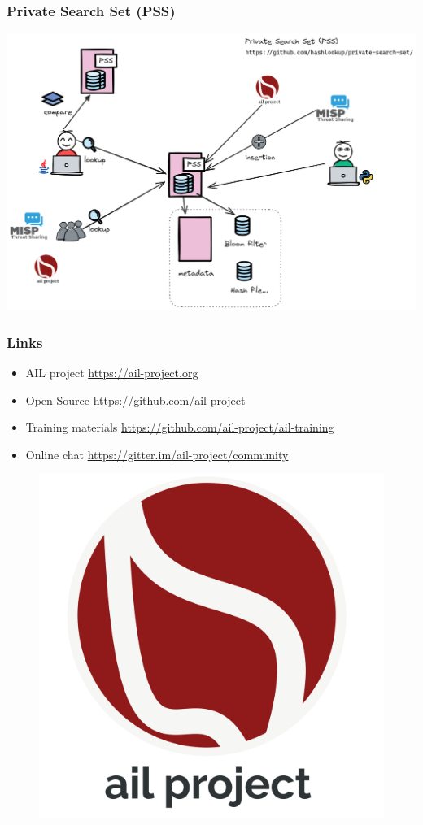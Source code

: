 \documentclass{beamer}
\begin{document}
\begin{frame}
    \frametitle{Private Search Set (PSS)}
    \begin{center}
        \includegraphics[scale=0.27]{images/pss-overview.png}
    \end{center}
\end{frame}


\begin{frame}
\frametitle{Links}
    \begin{itemize}
        \item AIL project \url{https://ail-project.org}
        \item Open Source \url{https://github.com/ail-project}
        \item Training materials  \url{https://github.com/ail-project/ail-training}
        \item Online chat \url{https://gitter.im/ail-project/community}
    \end{itemize}
    \begin{figure}
        \includegraphics[scale=0.1, angle=0]{images/ail-project.png}
    \end{figure}
\end{frame}
\end{document}
